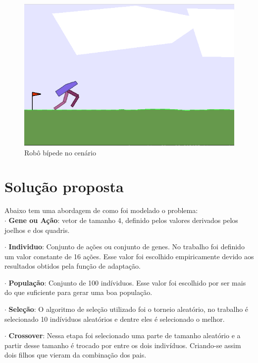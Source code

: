 \documentclass[article, a4paper, 12pt]{article}
\begin{document}
\begin{figure}[!htb]
     \centering
     \includegraphics[scale=0.5]{img/robot_begin.png}
     \caption{Robô bípede no cenário}
     \label{fig:robotbegin}
\end{figure}

\section{Solução proposta}

\hspace{1cm}Abaixo tem uma abordagem de como foi modelado o problema: \\

$\cdot$ \textbf{Gene ou Ação}: vetor de tamanho 4, definido pelos valores derivados pelos joelhos e dos quadris.

$\cdot$ \textbf{Individuo}: Conjunto de ações ou conjunto de genes. No trabalho foi definido um valor constante de 16 ações. Esse valor foi escolhido empiricamente devido aos resultados obtidos pela função de adaptação.

$\cdot$ \textbf{População}: Conjunto de 100 indíviduos. Esse valor foi escolhido por ser mais do que suficiente para gerar uma boa população. 

$\cdot$ \textbf{Seleção}: O algoritmo de seleção utilizado foi o torneio aleatório, no trabalho é selecionado 10 indíviduos aleatórios e dentre eles é selecionado o melhor.

$\cdot$ \textbf{Crossover}: Nessa etapa foi selecionado uma parte de tamanho aleatório e a partir desse tamanho é trocado por entre os dois indivíduos. Criando-se assim dois filhos que vieram da combinação dos pais.
\end{document}
